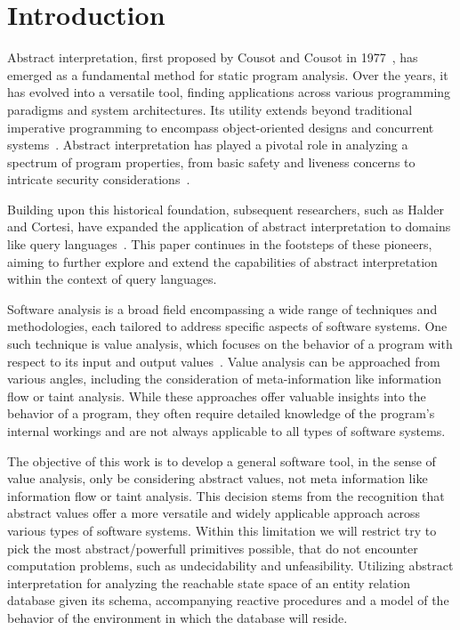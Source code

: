 
\section{Introduction}\label{sec:introduction}
Abstract interpretation, first proposed by Cousot and Cousot in 1977~\cite{cousot_abstract_1977}, has emerged as a fundamental method for static program analysis.
Over the years, it has evolved into a versatile tool, finding applications across various programming paradigms and system architectures.
Its utility extends beyond traditional imperative programming to encompass object-oriented designs and concurrent systems~\cite{gustafsson_analyzing_2013, mine_static_2023}.
Abstract interpretation has played a pivotal role in analyzing a spectrum of program properties, from basic safety and liveness concerns to intricate security considerations~\cite{mastroeni_abstract_2011}.

Building upon this historical foundation, subsequent researchers, such as Halder and Cortesi, have expanded the application of abstract interpretation to domains like query languages~\cite{halder_abstract_2012}.
This paper continues in the footsteps of these pioneers, aiming to further explore and extend the capabilities of abstract interpretation within the context of query languages.


Software analysis is a broad field encompassing a wide range of techniques and methodologies, each tailored to address specific aspects of software systems.
One such technique is value analysis, which focuses on the behavior of a program with respect to its input and output values~\cite{jackson_software_2000}.
Value analysis can be approached from various angles, including the consideration of meta-information like information flow or taint analysis.
While these approaches offer valuable insights into the behavior of a program, they often require detailed knowledge of the program's internal workings and are not always applicable to all types of software systems.

The objective of this work is to develop a general software tool, in the sense of value analysis, only be considering abstract values, not meta information like information flow or taint analysis.
This decision stems from the recognition that abstract values offer a more versatile and widely applicable approach across various types of software systems.
Within this limitation we will restrict try to pick the most abstract/powerfull primitives possible, that do not encounter computation problems, such as undecidability and unfeasibility.
Utilizing abstract interpretation for analyzing the reachable state space of an entity relation database given its schema, accompanying reactive procedures and a model of the behavior of the environment in which the database will reside.

